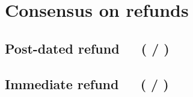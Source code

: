 \documentclass[../hydrozoa.tex]{subfiles}
\begin{document}

\section{Consensus on refunds}%
\label{h:l2-consensus-on-refunds}%


\subsection{Post-dated refund~~~( / )}%
\label{h:l2-consensus-post-dated-refund}%


\subsection{Immediate refund~~~( / )}%
\label{h:l2-consensus-immediate-refund}%

\end{document}
